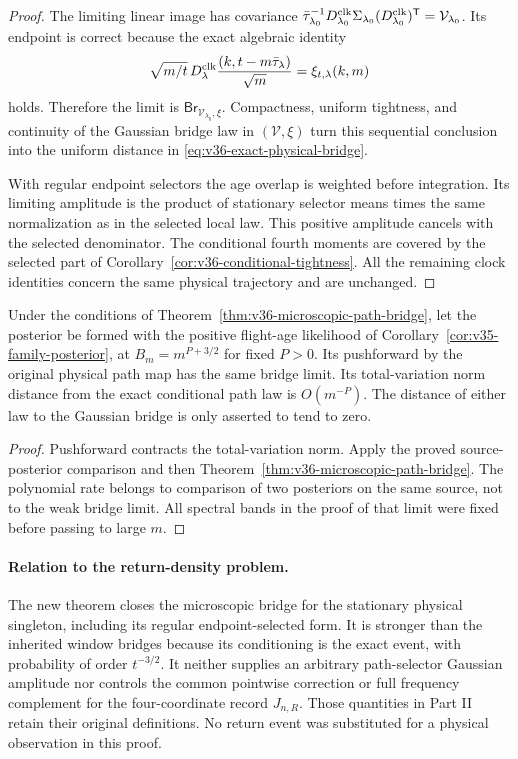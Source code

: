 \begin{proof}
The limiting linear image has covariance
$\bar\tau_{\lambda_0}^{-1}D_{\lambda_0}^{\rm clk}
\Sigma_{\lambda_0}(D_{\lambda_0}^{\rm clk})^{\mathsf T}
=\mathcal V_{\lambda_0}$. Its endpoint is correct because the exact
algebraic identity
\[
 \sqrt{m/t}\,D_\lambda^{\rm clk}
        \frac{(k,t-m\bar\tau_\lambda)}{\sqrt m}
                         =\xi_{t,\lambda}(k,m)
\]
holds. Therefore the limit is
$\mathsf{Br}_{\mathcal V_{\lambda_0},\xi}$.
Compactness, uniform tightness, and continuity of the Gaussian bridge
law in $(\mathcal V,\xi)$ turn this sequential conclusion into the
uniform distance in \eqref{eq:v36-exact-physical-bridge}.

With regular endpoint selectors the age overlap is weighted before
integration. Its limiting amplitude is the product of stationary
selector means times the same normalization as in the selected local
law. This positive amplitude cancels with the selected denominator.
The conditional fourth moments are covered by the selected part of
Corollary~\ref{cor:v36-conditional-tightness}. All the remaining clock
identities concern the same physical trajectory and are unchanged.
\end{proof}

\begin{corollary}
\label{cor:v36-band-posterior-bridge}
Under the conditions of Theorem~\ref{thm:v36-microscopic-path-bridge},
let the posterior be formed with the positive flight-age likelihood
of Corollary~\ref{cor:v35-family-posterior}, at
$B_m=m^{P+3/2}$ for fixed $P>0$. Its pushforward by the original
physical path map has the same bridge limit. Its total-variation
norm distance from the exact conditional path law is $O(m^{-P})$.
The distance of either law to the Gaussian bridge is only asserted
to tend to zero.
\end{corollary}
\begin{proof}
Pushforward contracts the total-variation norm. Apply the proved
source-posterior comparison and then
Theorem~\ref{thm:v36-microscopic-path-bridge}. The polynomial rate
belongs to comparison of two posteriors on the same source, not to
the weak bridge limit. All spectral bands in the proof of that limit
were fixed before passing to large $m$.
\end{proof}

\paragraph{Relation to the return-density problem.}
The new theorem closes the microscopic bridge for the stationary
physical singleton, including its regular endpoint-selected form.
It is stronger than the inherited window bridges because its
conditioning is the exact event, with probability of order $t^{-3/2}$.
It neither supplies an arbitrary path-selector Gaussian amplitude nor
controls the common pointwise correction or full frequency complement
for the four-coordinate record $J_{n,R}$. Those quantities in Part II
retain their original definitions. No return event was substituted
for a physical observation in this proof.
